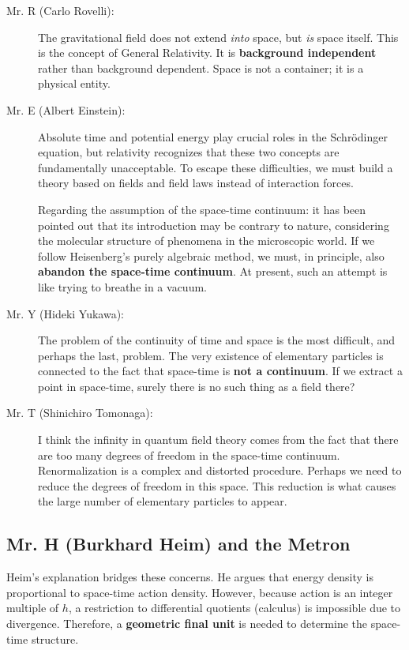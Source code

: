 \documentclass[11pt,a4paper,oneside]{article}
\begin{document}
\begin{description}
    \item[Mr. R (Carlo Rovelli):] The gravitational field does not extend \textit{into} space, but \textit{is} space itself. This is the concept of General Relativity. It is \textbf{background independent} rather than background dependent. Space is not a container; it is a physical entity.

    \item[Mr. E (Albert Einstein):] Absolute time and potential energy play crucial roles in the Schrödinger equation, but relativity recognizes that these two concepts are fundamentally unacceptable. To escape these difficulties, we must build a theory based on fields and field laws instead of interaction forces.

    Regarding the assumption of the space-time continuum: it has been pointed out that its introduction may be contrary to nature, considering the molecular structure of phenomena in the microscopic world. If we follow Heisenberg’s purely algebraic method, we must, in principle, also \textbf{abandon the space-time continuum}. At present, such an attempt is like trying to breathe in a vacuum.

    \item[Mr. Y (Hideki Yukawa):] The problem of the continuity of time and space is the most difficult, and perhaps the last, problem. The very existence of elementary particles is connected to the fact that space-time is \textbf{not a continuum}. If we extract a point in space-time, surely there is no such thing as a field there?

    \item[Mr. T (Shinichiro Tomonaga):] I think the infinity in quantum field theory comes from the fact that there are too many degrees of freedom in the space-time continuum. Renormalization is a complex and distorted procedure. Perhaps we need to reduce the degrees of freedom in this space. This reduction is what causes the large number of elementary particles to appear.
\end{description}

\subsection{Mr. H (Burkhard Heim) and the Metron}

Heim's explanation bridges these concerns. He argues that energy density is proportional to space-time action density. However, because action is an integer multiple of $h$, a restriction to differential quotients (calculus) is impossible due to divergence. Therefore, a \textbf{geometric final unit} is needed to determine the space-time structure.
\end{document}
